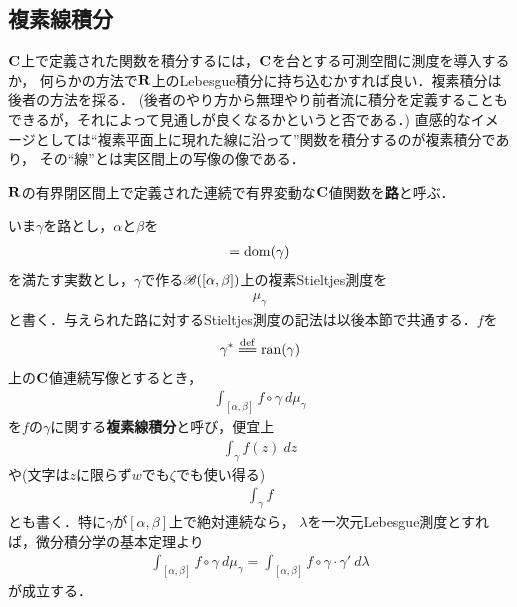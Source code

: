\subsection{複素線積分}
	
	$\mathbf{C}$上で定義された関数を積分するには，$\mathbf{C}$を台とする可測空間に測度を導入するか，
	何らかの方法で$\mathbf{R}$上のLebesgue積分に持ち込むかすれば良い．複素積分は後者の方法を採る．
	(後者のやり方から無理やり前者流に積分を定義することもできるが，それによって見通しが良くなるかというと否である．)
	直感的なイメージとしては``複素平面上に現れた線に沿って''関数を積分するのが複素積分であり，
	その``線''とは実区間上の写像の像である．
	
	\begin{screen}
		\begin{dfn}[路]
			$\mathbf{R}$の有界閉区間上で定義された連続で有界変動な$\mathbf{C}$値関数を{\bf 路}と呼ぶ．
		\end{dfn}
	\end{screen}
	
	いま$\gamma$を路とし，$\alpha$と$\beta$を
	\begin{align}
		[\alpha,\beta] = \dom{\gamma}
	\end{align}
	を満たす実数とし，$\gamma$で作る$\mathscr{B}([\alpha,\beta])$上の複素Stieltjes測度を
	\begin{align}
		\mu_{\gamma}
	\end{align}
	と書く．与えられた路に対するStieltjes測度の記法は以後本節で共通する．$f$を
	\begin{align}
		\gamma^* \defeq \ran{\gamma}
	\end{align}
	上の$\mathbf{C}$値連続写像とするとき，
	\begin{align}
		\int_{[\alpha,\beta]} f \circ \gamma\ d\mu_{\gamma}
	\end{align}
	を$f$の$\gamma$に関する{\bf 複素線積分}と呼び，便宜上
	\begin{align}
		\int_{\gamma} f(z)\ dz
	\end{align}
	や(文字は$z$に限らず$w$でも$\zeta$でも使い得る)
	\begin{align}
		\int_{\gamma} f
	\end{align}
	とも書く．特に$\gamma$が$[\alpha,\beta]$上で絶対連続なら，
	$\lambda$を一次元Lebesgue測度とすれば，微分積分学の基本定理より
	\begin{align}
		\int_{[\alpha,\beta]} f \circ \gamma\ d\mu_\gamma = \int_{[\alpha,\beta]}f \circ \gamma \cdot \gamma'\ d\lambda
	\end{align}
	が成立する．
	
